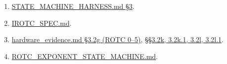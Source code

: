 \documentclass[11pt]{article}
\begin{document}
\begin{enumerate}

\item \href{https://github.com/pinnacletechnologysolutionsltd/SPU/blob/v1.2-typestate/docs/STATE_MACHINE_HARNESS.md#3-subsystem-state-machines}{STATE\_MACHINE\_HARNESS.md §3}.

\item \href{https://github.com/pinnacletechnologysolutionsltd/SPU/blob/v1.2-typestate/docs/IROTC_SPEC.md}{IROTC\_SPEC.md}.

\item \href{https://github.com/pinnacletechnologysolutionsltd/SPU/blob/v1.2-typestate/docs/hardware_evidence.md#32g-rotc-0-5-silicon-probe}{hardware\_evidence.md §3.2g (ROTC 0–5)}, \href{https://github.com/pinnacletechnologysolutionsltd/SPU/blob/v1.2-typestate/docs/hardware_evidence.md#32k-irotc-icosahedral-rotation-engine-silicon-probe}{§§3.2k, 3.2k.1, 3.2l, 3.2l.1}.

\item \href{https://github.com/pinnacletechnologysolutionsltd/SPU/blob/v1.2-typestate/docs/ROTC_EXPONENT_STATE_MACHINE.md}{ROTC\_EXPONENT\_STATE\_MACHINE.md}.

\end{enumerate}
\end{document}
